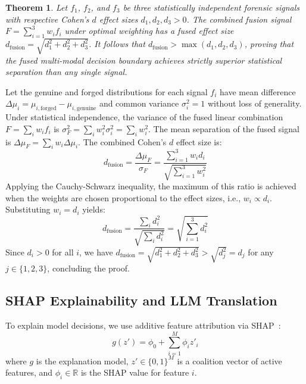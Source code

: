 \documentclass[journal]{IEEEtran}
\newtheorem{theorem}{Theorem}
\begin{document}
\begin{theorem}
\label{thm:fusion_superiority}
Let $f_1$, $f_2$, and $f_3$ be three statistically independent forensic signals with respective Cohen's $d$ effect sizes $d_1, d_2, d_3 > 0$. The combined fusion signal $F = \sum_{i=1}^3 w_i f_i$ under optimal weighting has a fused effect size $d_{\text{fusion}} = \sqrt{d_1^2 + d_2^2 + d_3^2}$. It follows that $d_{\text{fusion}} > \max(d_1, d_2, d_3)$, proving that the fused multi-modal decision boundary achieves strictly superior statistical separation than any single signal.
\end{theorem}
\begin{IEEEproof}
Let the genuine and forged distributions for each signal $f_i$ have mean difference $\Delta \mu_i = \mu_{i, \text{forged}} - \mu_{i, \text{genuine}}$ and common variance $\sigma_i^2 = 1$ without loss of generality. Under statistical independence, the variance of the fused linear combination $F = \sum_i w_i f_i$ is $\sigma_F^2 = \sum_i w_i^2 \sigma_i^2 = \sum_i w_i^2$. The mean separation of the fused signal is $\Delta \mu_F = \sum_i w_i \Delta \mu_i$. The combined Cohen's $d$ effect size is:
\begin{equation}
    d_{\text{fusion}} = \frac{\Delta \mu_F}{\sigma_F} = \frac{\sum_{i=1}^3 w_i d_i}{\sqrt{\sum_{i=1}^3 w_i^2}}
\end{equation}
Applying the Cauchy-Schwarz inequality, the maximum of this ratio is achieved when the weights are chosen proportional to the effect sizes, i.e., $w_i \propto d_i$. Substituting $w_i = d_i$ yields:
\begin{equation}
    d_{\text{fusion}} = \frac{\sum_i d_i^2}{\sqrt{\sum_i d_i^2}} = \sqrt{\sum_{i=1}^3 d_i^2}
\end{equation}
Since $d_i > 0$ for all $i$, we have $d_{\text{fusion}} = \sqrt{d_1^2 + d_2^2 + d_3^2} > \sqrt{d_j^2} = d_j$ for any $j \in \{1, 2, 3\}$, concluding the proof.
\end{IEEEproof}

\subsection{SHAP Explainability and LLM Translation}
To explain model decisions, we use additive feature attribution via SHAP~\cite{shap}:
\begin{equation}
g(z') = \phi_0 + \sum_{i=1}^{M} \phi_i z'_i
\end{equation}
where $g$ is the explanation model, $z' \in \{0, 1\}^M$ is a coalition vector of active features, and $\phi_i \in \mathbb{R}$ is the SHAP value for feature $i$.
\end{document}
